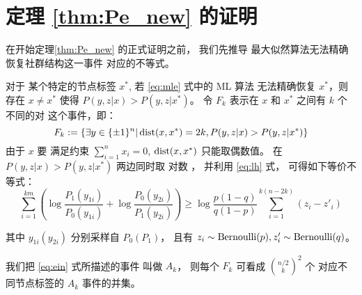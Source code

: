 \section{定理 \ref{thm:Pe_new} 的证明}

在开始定理\ref{thm:Pe_new} 的正式证明之前，
我们先推导
最大似然算法无法精确恢复社群结构这一事件
对应的不等式。

对于
某个特定的节点标签
$x^*$,
若
\eqref{eq:mle} 式中的 ML 算法
无法精确恢复 
$x^*$，则
存在 $x\neq x^*$ 使得 $P(y,z|x) > P(y,z|x^*)$。
令 $F_k$ 表示在 $x$ 和 $x^*$ 之间有 $k$ 个不同的对
这个事件，即：
    \begin{equation}\label{eq:Fk}
    F_k:=\{\exists y \in \{\pm 1\}^n |
    \operatorname{dist}(x, x^*)=2k,
    P(y,z|x) > 
    P(y,z|x^*) \}
    \end{equation}
    由于
    $x$ 要 满足约束
    $\sum_{i=1}^n x_i=0$,
    $\operatorname{dist}(x, x^*)$
    只能取偶数值。
    在
    $P(y,z|x) > P(y,z|x^*)$
    两边同时取
    对数
    ， 并利用
    \eqref{eq:lh} 式，
    可得如下等价不等式：
    \begin{equation}\label{eq:ein}
    \sum_{i=1}^{km}
    \left(\log \frac{P_1(y_{1i})}
    {P_0(y_{1i})}
    + \log \frac{P_0(y_{2i})}
    {P_1(y_{2i})}
    \right)
    \geq \log \frac{p(1-q)}{q(1-p)} \sum_{i=1}^{k(n-2k)}(z_{i} - z'_{i})
    \end{equation}
    
    其中 $y_{1i}(y_{2i})$ 分别采样自
    $P_0(P_1)$，
    且有 $z_{i} \sim \operatorname{Bernoulli}(p), z'_{i} \sim \operatorname{Bernoulli}(q)$。
    
    我们把 \eqref{eq:ein} 式所描述的事件
    叫做 $A_k$，
    则每个 $F_k$ 
    可看成
     $\binom{n/2}{k}^2$ 个
    对应不同节点标签的
    $A_k$ 事件的并集。
    
